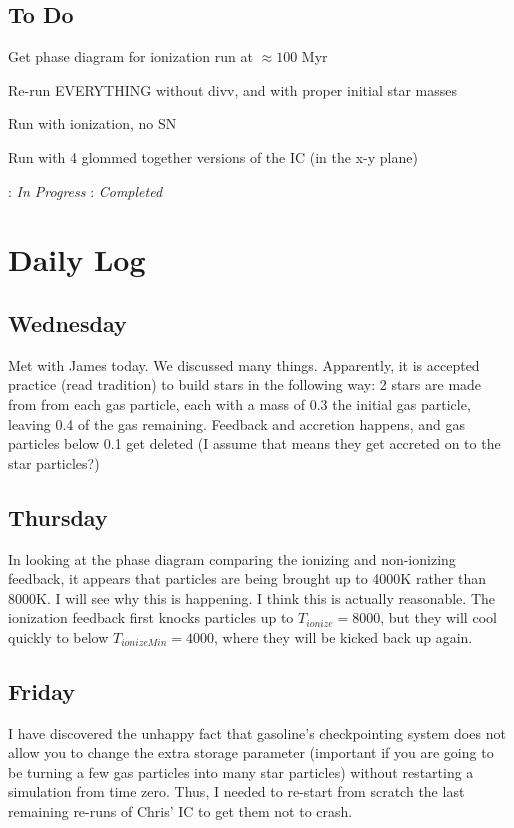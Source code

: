 \documentclass[11pt,letterpaper]{article}
\begin{document}
\subsection*{To Do}
\begin{bullets}
\item \checkmark Get phase diagram for ionization run at $\approx 100$ Myr
\item \textleaf Re-run EVERYTHING without divv, and with proper initial star masses
\item \textleaf Run with ionization, no SN
\item Run with 4 glommed together versions of the IC (in the x-y plane)
\end{bullets}

\textleaf : \textit{In Progress} \qquad \checkmark : \textit{Completed}

\section*{Daily Log}
\subsection*{Wednesday}
Met with James today.  We discussed many things.  Apparently, it is accepted 
practice (read tradition) to build stars in the following way:  2 stars are 
made from from each gas particle, each with a mass of 0.3 the initial gas 
particle, leaving 0.4 of the gas remaining.  Feedback and accretion happens, 
and gas particles below 0.1 get deleted (I assume that means they get accreted
on to the star particles?)

\subsection*{Thursday}
In looking at the phase diagram comparing the ionizing and non-ionizing 
feedback, it appears that particles are being brought up to 4000K rather than 
8000K.  I will see why this is happening.  I think this is actually reasonable.
The ionization feedback first knocks particles up to $T_{ionize}=8000$, but 
they will cool quickly to below $T_{ionizeMin}=4000$, where they will be kicked
back up again.

\subsection*{Friday}
I have discovered the unhappy fact that gasoline's checkpointing system does not
allow you to change the extra storage parameter (important if you are going to
be turning a few gas particles into many star particles) without restarting a 
simulation from time zero.  Thus, I needed to re-start from scratch the last
remaining re-runs of Chris' IC to get them not to crash.
\end{document}
